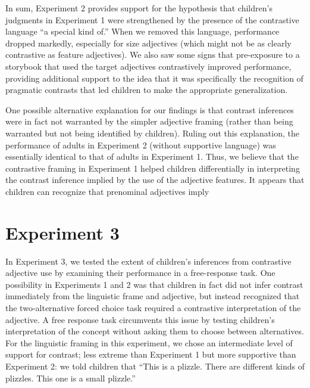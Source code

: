 \documentclass[man]{apa2}
\begin{document}

In sum, Experiment 2 provides support for the hypothesis that children's judgments in Experiment 1 were strengthened by the presence of the contrastive language ``a special kind of.'' When we removed this language, performance dropped markedly, especially for size adjectives (which might not be as clearly contrastive as feature adjectives). We also saw some signs that pre-exposure to a storybook that used the target adjectives contrastively improved performance, providing additional support to the idea that it was specifically the recognition of pragmatic contrasts that led children to make the appropriate generalization. 

One possible alternative explanation for our findings is that contrast inferences were in fact not warranted by the simpler adjective framing (rather than being warranted but not being identified by children). Ruling out this explanation, the performance of adults in Experiment 2 (without supportive language) was essentially identical to that of adults in Experiment 1. Thus, we believe that the contrastive framing in Experiment 1 helped children differentially in interpreting the contrast inference implied by the use of the adjective features. It appears that children can recognize that prenominal adjectives imply 

\section{Experiment 3} 

In Experiment 3, we tested the extent of children's inferences from contrastive adjective use by examining their performance in a free-response task. One possibility in Experiments 1 and 2 was that children in fact did not infer contrast immediately from the linguistic frame and adjective, but instead recognized that the two-alternative forced choice task required a contrastive interpretation of the adjective. A free response task circumvents this issue by testing children's interpretation of the concept without asking them to choose between alternatives. For the linguistic framing in this experiment, we chose an intermediate level of support for contrast; less extreme than Experiment 1 but more supportive than Experiment 2: we told children that ``This is a plizzle. There are different kinds of plizzles. This one is a small plizzle.'' 
\end{document}
